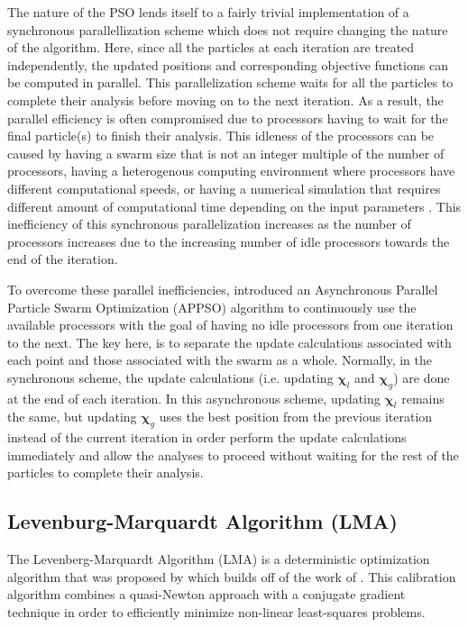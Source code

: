 The nature of the PSO lends itself to a fairly trivial implementation of a synchronous parallellization scheme which does not require changing the nature of the algorithm. Here, since all the particles at each iteration are treated independently, the updated positions and corresponding objective functions can be computed in parallel. This parallelization scheme waits for all the particles to complete their analysis before moving on to the next iteration. As a result, the parallel efficiency is often compromised due to processors having to wait for the final particle(s) to finish their analysis. This idleness of the processors can be caused by having a swarm size that is not an integer multiple of the number of processors, having a heterogenous computing environment where processors have different computational speeds, or having a numerical simulation that requires different amount of computational time depending on the input parameters \citep{Venter_2006}. This inefficiency of this synchronous parallelization increases as the number of processors increases due to the increasing number of idle processors towards the end of the iteration.

To overcome these parallel inefficiencies, \citet{Venter_2006} introduced an Asynchronous Parallel Particle Swarm Optimization (APPSO) algorithm to continuously use the available processors with the goal of having no idle processors from one iteration to the next. The key here, is to separate the update calculations associated with each point and those associated with the swarm as a whole. Normally, in the synchronous scheme, the update calculations (i.e. updating $\boldsymbol{\chi}_l$ and $\boldsymbol{\chi}_g$) are done at the end of each iteration. In this asynchronous scheme, updating $\boldsymbol{\chi}_l$ remains the same, but updating $\boldsymbol{\chi}_g$ uses the best position from the previous iteration instead of the current iteration in order perform the update calculations immediately and allow the analyses to proceed without waiting for the rest of the particles to complete their analysis.

\subsection{Levenburg-Marquardt Algorithm (LMA)}

The Levenberg-Marquardt Algorithm (LMA) is a deterministic optimization algorithm that was proposed by \citet{marquardt_algorithm_1963} which builds off of the work of \citet{levenberg_method_1944}. This calibration algorithm combines a quasi-Newton approach with a conjugate gradient technique in order to efficiently minimize non-linear least-squares problems. 


